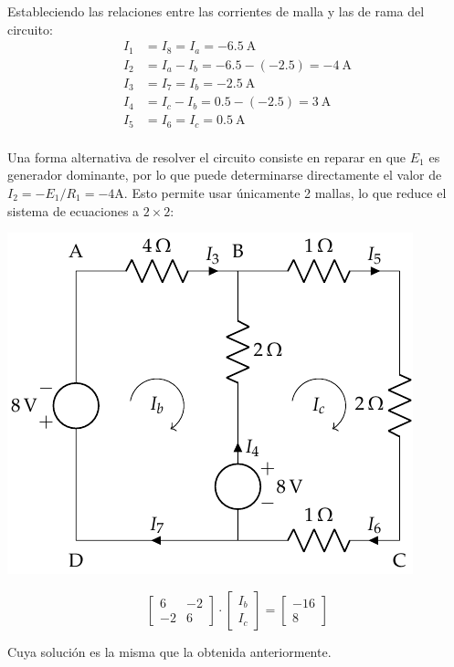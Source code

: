 Estableciendo las relaciones entre las corrientes de malla y las de
rama del circuito:
\begin{align*}
  I_1&=I_8=I_a=\qty{-6.5}{\ampere}\\
  I_2&=I_a-I_b=-6.5-(-2.5)=\qty{-4}{\ampere}\\
  I_3&=I_7=I_b=\qty{-2.5}{\ampere}\\
  I_4&=I_c-I_b=0.5-(-2.5)=\qty{3}{\ampere}\\
  I_5&=I_6=I_c=\qty{0.5}{\ampere}\\
\end{align*}

Una forma alternativa de resolver el circuito consiste en reparar en que $E_1$ es generador dominante, por lo que puede determinarse directamente el valor de $I_2 = - E_1 / R_1 = -4\si{\ampere}$. Esto permite usar únicamente 2 mallas, lo que reduce el sistema de ecuaciones a $2\times 2$: 

\vspace{2mm}
\begin{minipage}{0.6\linewidth}
    \begin{center}
    \includegraphics{figuras/BT1_11_mod2.pdf}
    \end{center}
\end{minipage}
\begin{minipage}{0.4\linewidth}
    \begin{equation*}
      \begin{bmatrix}
        6 & -2  \\
        -2 & 6
      \end{bmatrix} \cdot
      \begin{bmatrix}
        I_b\\
        I_c
      \end{bmatrix} = %
      \begin{bmatrix}
        -16\\
        8
      \end{bmatrix}
    \end{equation*}
\end{minipage}
Cuya solución es la misma que la obtenida anteriormente.

